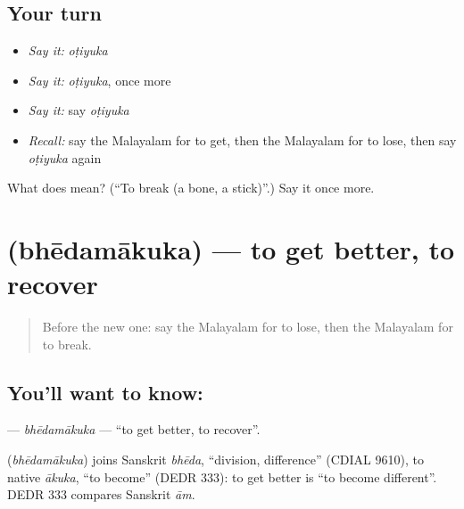 \subsection*{Your turn}
\begin{itemize}
\raggedright
  \item \emph{Say it:} \emph{oṭiyuka}
  \item \emph{Say it:} \emph{oṭiyuka}, once more
  \item \emph{Say it:} say \emph{oṭiyuka}
  \item \emph{Recall:} say the Malayalam for to get, then the Malayalam for to lose, then say \emph{oṭiyuka} again
\end{itemize}

\begin{tcolorbox}[breakable,colback=teal!4,colframe=teal!35!black,title={Before you move on}]
What does  mean? (\textquotedblleft{}To break (a bone, a stick)\textquotedblright{}.) Say it once more.
\end{tcolorbox}
\section[\texorpdfstring{\ml{ഭേദമാകുക} (bhēdamākuka)}{ഭേദമാകുക (bhēdamākuka)}]{ (bhēdamākuka) — to get better, to recover}

\label{lesson:ML-C184-bhedamakuka}



\begin{quote}
Before the new one: say the Malayalam for to lose, then the Malayalam for to break.
\end{quote}

\subsection*{You'll want to know: }
\textbf{} — \emph{bhēdamākuka} — \textquotedblleft{}to get better, to recover\textquotedblright{}.

\begin{cousinweb}
\textbf{} (\emph{bhēdamākuka}) joins Sanskrit \emph{bhēda}, \textquotedblleft{}division, difference\textquotedblright{} (CDIAL 9610), to native \emph{ākuka}, \textquotedblleft{}to become\textquotedblright{} (DEDR 333): to get better is \textquotedblleft{}to become different\textquotedblright{}. DEDR 333 compares Sanskrit \emph{ām}.
\end{cousinweb}

